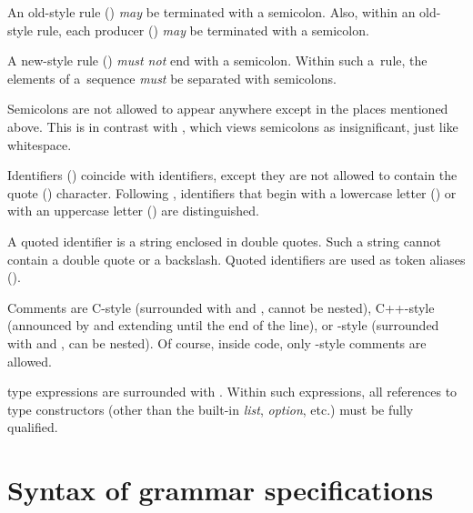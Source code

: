 \documentclass[onecolumn,11pt,nocopyrightspace,preprint]{sigplanconf}
\begin{document}
An old-style rule () \emph{may} be terminated with a
semicolon. Also, within an old-style rule, each producer
() \emph{may} be terminated with a semicolon.

A new-style rule () \emph{must not} end with a
semicolon. Within such a~rule, the elements of a~sequence \emph{must} be
separated with semicolons.

Semicolons are not allowed to appear anywhere except in the places mentioned
above. This is in contrast with \ocamlyacc, which views semicolons as
insignificant, just like whitespace.

Identifiers () coincide with \ocaml identifiers, except they are not
allowed to contain the quote () character. Following
\ocaml, identifiers that begin with a lowercase letter
() or with an uppercase letter () are distinguished.

A quoted identifier  is a string enclosed in double quotes.
Such a string cannot contain a double quote or a backslash.
Quoted identifiers are used as token aliases ().

Comments are C-style (surrounded with \kw{/*} and \kw{*/}, cannot be nested),
C++-style (announced by \kw{/$\!$/} and extending until the end of the line), or
\ocaml-style (surrounded with \kw{(*} and \kw{*)}, can be nested). Of course,
inside \ocaml code, only \ocaml-style comments are allowed.

\ocaml type expressions are surrounded with . Within such expressions,
all references to type constructors (other than the built-in \textit{list}, \textit{option}, etc.)
must be fully qualified.


\section{Syntax of grammar specifications}


\newcommand{\modifier}{(\,\dquestion \metachoice \dplus \metachoice \dstar\hspace{-.3mm})}
\end{document}
